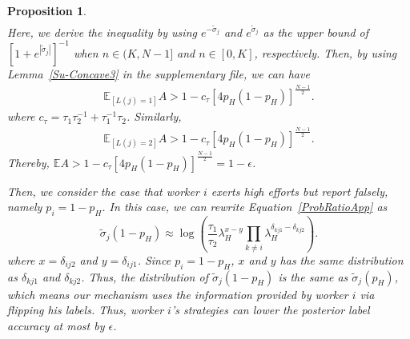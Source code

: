 \documentclass{article}
\makeatletter
\newtheorem{proposition}[theorem]{Proposition}
\renewenvironment{proof}[1][\proofname]{\par
  \vspace{-\topsep}%
  \pushQED{\qed}%
  \normalfont
  \topsep0pt \partopsep0pt %
  \trivlist
  \item[\hskip\labelsep
        \itshape
    #1\@addpunct{.}]\ignorespaces
}{%
  \popQED\endtrivlist\@endpefalse
  \addvspace{0pt plus 0pt} %
}
\makeatother
\begin{document}
\begin{proposition}
\begin{proof}
\begin{equation*}
\begin{split}
\end{split}
\end{equation*}
Here, we derive the inequality by using $e^{-\tilde{\sigma}_j}$ and $e^{\tilde{\sigma}_j}$ as the upper bound of $[1+e^{|\tilde{\sigma}_j|}]^{-1}$ when $n\in (K, N-1]$ and $n\in [0, K]$, respectively. Then, by using Lemma~\ref{Su-Concave3} in the supplementary file, we can have
\begin{equation}
\begin{split}
\mathbb{E}_{[L(j)=1]}A > 1-c_{\tau}[4p_H(1-p_H)]^{\frac{N-1}{2}}.
\end{split}
\end{equation}
where $c_{\tau}=\tau_1\tau_2^{-1}+\tau_1^{-1}\tau_2$. Similarly,
\begin{equation}
\begin{split}
\mathbb{E}_{[L(j)=2]}A > 1-c_{\tau}[4p_H(1-p_H)]^{\frac{N-1}{2}}.
\end{split}
\end{equation}
Thereby, $\mathbb{E}A>1-c_{\tau}[4p_H(1-p_H)]^{\frac{N-1}{2}}=1-\epsilon$.


Then, we consider the case that worker $i$ exerts high efforts but report falsely, namely $p_i=1-p_H$. In this case, we can rewrite Equation~\ref{ProbRatioApp} as
\begin{equation}
\tilde{\sigma}_j(1-p_H)\approx \log\left(\frac{\tau_{1}}{\tau_{2}}\lambda_H^{x-y}{\prod}_{k\neq i}\lambda_H^{\delta_{kj1}-\delta_{kj2}}\right).
\end{equation}
where $x=\delta_{ij2}$ and $y=\delta_{ij1}$. Since $p_i=1-p_H$, $x$ and $y$ has the same distribution as $\delta_{kj1}$ and $\delta_{kj2}$. Thus, the distribution of $\tilde{\sigma}_j(1-p_H)$ is the same as $\tilde{\sigma}_j(p_H)$, {\color{red} which means our mechanism uses the information provided by worker $i$ via flipping his labels}. Thus, worker $i$'s strategies can lower the posterior label accuracy at most by $\epsilon$.


\end{proof}
\end{proposition}
\end{document}
